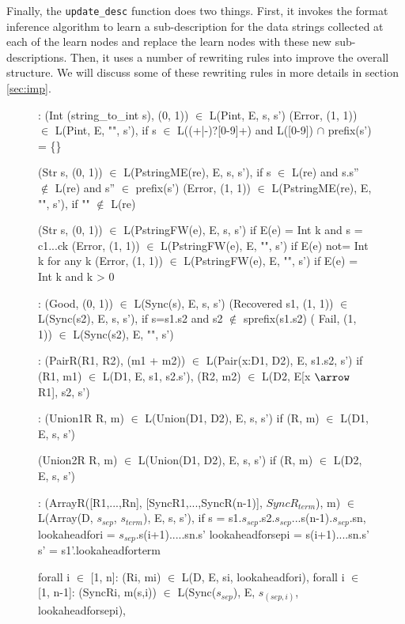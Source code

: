 Finally, the {\tt update\_desc} function does two things. 
First, it invokes the format inference
algorithm to learn a sub-description for the data strings collected 
at each of the learn nodes
and replace the learn nodes with these new sub-descriptions. 
Then, it uses a number of rewriting
rules into improve the overall structure. 
We will discuss some of these rewriting rules in more
details in section \ref{sec:imp}.

\begin{figure}[ht]
\begin{center}
{\small
\begin{code}
\cdmath
{}:
  (Int (string\_to\_int s), (0, 1)) $\in$ L(Pint, E, s, s')
  (Error, (1, 1)) $\in$ L(Pint, E, "", s'), 
  if s $\in$ L((+|-)?[0-9]+) and L([0-9]) $\cap$ prefix(s') = \{\}

  (Str s, (0, 1)) $\in$ L(PstringME(re), E, s, s'),
	if s $\in$ L(re) and s.s'' $\not\in$ L(re) and s'' $\in$ prefix(s') 
  (Error, (1, 1)) $\in$ L(PstringME(re), E, "", s'), if "" $\not\in$ L(re)

  (Str s, (0, 1)) $\in$ L(PstringFW(e), E, s, s') if E(e) = Int k and s = c1...ck
  (Error, (1, 1)) $\in$ L(PstringFW(e), E, "", s') if E(e) not= Int k for any k
  (Error, (1, 1)) $\in$ L(PstringFW(e), E, "", s') if E(e) = Int k and k > 0

:
  (Good, (0, 1)) $\in$ L(Sync(s), E, s, s')
  (Recovered s1, (1, 1)) $\in$ L(Sync(s2), E, s, s'), if s=s1.s2 and s2 $\not\in$ sprefix(s1.s2)
(  Fail, (1, 1)) $\in$ L(Sync(s2), E, "", s')

:
  (PairR(R1, R2), (m1 + m2)) $\in$ L(Pair(x:D1, D2), E, s1.s2, s')
        if (R1, m1) $\in$ L(D1, E, s1, s2.s'),
           (R2, m2) $\in$ L(D2, E[x $\arrow$ R1], s2, s')

:
  (Union1R R, m) $\in$ L(Union(D1, D2), E, s, s')
        if (R, m) $\in$ L(D1, E, s, s')

  (Union2R R, m) $\in$ L(Union(D1, D2), E, s, s')
        if (R, m) $\in$ L(D2, E, s, s')

:
  (ArrayR([R1,...,Rn], [SyncR1,...,SyncR(n-1)], $SyncR_{term}$), m)
    $\in$ L(Array(D, $s_{sep}$, $s_{term}$), E, s, s'),
        if
        s = s1.$s_{sep}$.s2.$s_{sep}$...s(n-1).$s_{sep}$.sn,
        lookaheadfori = $s_{sep}$.s(i+1).....sn.s'
        lookaheadforsepi = s(i+1)....sn.s'
        s' = s1'.lookaheadforterm

        forall i $\in$ [1, n]:
          (Ri, mi) $\in$ L(D, E, si, lookaheadfori),
        forall i $\in$ [1, n-1]:
          (SyncRi, m(s,i)) $\in$ L(Sync($s_{sep}$), E, $s_{(sep,i)}$, lookaheadforsepi),


\end{code}}
\end{center}
\end{figure}
